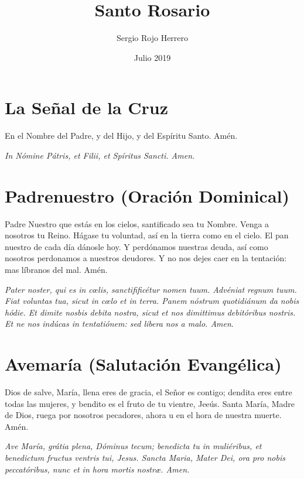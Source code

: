 \documentclass[a4paper,11pt, oneside]{report}
\title{Santo Rosario}
\author{Sergio Rojo Herrero}
\date{Julio 2019}
\begin{document}
  
\begin{titlepage}
  \maketitle    
\end{titlepage}

\section*{La Señal de la Cruz}
  {  
    En el Nombre del Padre, y del Hijo, y del Espíritu Santo. Amén.

    \medskip

    \textit{In Nómine Pátris, et Filii, et Spíritus Sancti. Amen.}
  }

\section*{Padrenuestro (Oración Dominical)}
  {  
    Padre Nuestro que estás en los cielos, santificado sea tu Nombre. Venga a nosotros tu Reino. Hágase tu voluntad, así en la tierra como
    en el cielo. El pan nuestro de cada día dánosle hoy. Y perdónamos nuestras deuda, así como nosotros perdonamos a nuestros deudores.
    Y no nos dejes caer en la tentación: mas líbranos del mal. Amén.
    
    \medskip

    \textit{Pater noster, qui es in c{\oe}lis, sanctifificétur nomen tuum. Advéniat regnum tuum. Fiat voluntas tua, sicut in c{\oe}lo et in terra.
    Panem nóstrum quotidiánum da nobis hódie. Et dimite nosbis debita nostra, sicut et nos dimittimus debitóribus nostris. Et ne nos indúcas
    in tentatiónem: sed libera nos a malo. Amen}.
  }

\section*{Avemaría (Salutación Evangélica)}
  {  
    Dios de salve, María, llena eres de gracia, el Señor es contigo; dendita eres entre todas las mujeres, y bendito es el fruto de tu
    vientre, Jeeús. Santa María, Madre de Dios, ruega por nosotros pecadores, ahora u en el hora de nuestra muerte. Amén.
    
    \medskip

    \textit{Ave María, grátia plena, Dóminus tecum; benedicta tu in muliéribus, et benedictum fructus ventris tui, Jesus.
    Sancta Maria, Mater Dei, ora pro nobis peccatóribus, nunc et in hora mortis nostr{\ae}. Amen.}
  }
\end{document}
